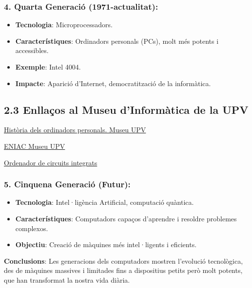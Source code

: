 \documentclass[
  12 pt,
  a4paper,
]{article}
\providecommand{\tightlist}{%
  \setlength{\itemsep}{0pt}\setlength{\parskip}{0pt}}
\begin{document}
\subsubsection{4. Quarta Generació
(1971-actualitat):}\label{quarta-generaciuxf3-1971-actualitat}

\begin{itemize}
\tightlist
\item
  \textbf{Tecnologia}: Microprocessadors.
\item
  \textbf{Característiques}: Ordinadors personals (PCs), molt més
  potents i accessibles.
\item
  \textbf{Exemple}: Intel 4004.
\item
  \textbf{Impacte}: Aparició d'Internet, democratització de la
  informàtica.
\end{itemize}

\subsection{2.3 Enllaços al Museu d'Informàtica de la
UPV}\label{enllauxe7os-al-museu-dinformuxe0tica-de-la-upv}

\href{https://museo.inf.upv.es/va/historia-del-ordenador-personal/}{Història
dels ordinadors personals. Museu UPV}

\href{https://museo.inf.upv.es/eniac-2/}{ENIAC Museu UPV}

\href{https://museo.inf.upv.es/va/apollo-guidance-computer/}{Ordenador
de circuits integrats}

\subsubsection{5. Cinquena Generació
(Futur):}\label{cinquena-generaciuxf3-futur}

\begin{itemize}
\tightlist
\item
  \textbf{Tecnologia}: Intel·ligència Artificial, computació quàntica.
\item
  \textbf{Característiques}: Computadors capaços d'aprendre i resoldre
  problemes complexos.
\item
  \textbf{Objectiu}: Creació de màquines més intel·ligents i eficients.
\end{itemize}

\textbf{Conclusions}: Les generacions dels computadors mostren
l'evolució tecnològica, des de màquines massives i limitades fins a
dispositius petits però molt potents, que han transformat la nostra vida
diària.
\end{document}
